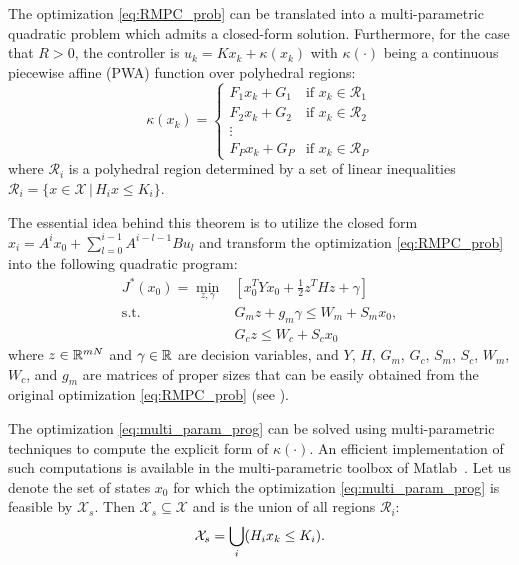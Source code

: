 \begin{theorem}
The optimization \eqref{eq:RMPC_prob} can be translated into a multi-parametric quadratic problem which admits a closed-form solution. Furthermore, for the case that $R>0$, the controller is $u_k = K x_k + \kappa(x_k)$ with $\kappa(\cdot)$ being a continuous piecewise affine (PWA) function over polyhedral regions:
\begin{equation}
\kappa(x_k)=
\begin{cases}
F_1x_k+G_1 & \text{if $x_k\in \mathcal{R}_1$}\\
F_2x_k+G_2 & \text{if $x_k\in \mathcal{R}_2$}\\
\vdots\\
F_Px_k+G_P & \text{if $x_k\in \mathcal{R}_P$}
\end{cases} 
\end{equation}
where $\mathcal{R}_i$ is a polyhedral region determined by a set of linear inequalities $\mathcal R_i = \{x\in\mathcal X\,|\,H_ix\leq K_i\}$. 
\end{theorem}
The essential idea behind this theorem is to utilize the closed form $x_i=A^ix_0+\sum_{l=0}^{i-1}A^{i-l-1}Bu_l$ and transform the optimization \eqref{eq:RMPC_prob} into the following quadratic program:
\begin{align}
\label{eq:multi_param_prog}
J^{\ast}(x_0)=\min_{z,\gamma}& \left[x_0^TYx_0+\frac{1}{2}z^THz+\gamma\right]\\
\text{s.t.} \quad &G_mz+g_m\gamma\leq W_m+S_mx_0,\nonumber\\
&G_cz\leq W_c+S_cx_0\nonumber
\end{align}
where $z\in \mathbb{R}^{mN}$ and $\gamma\in\mathbb{R}$ are decision variables, and $Y$, $H$, $G_m$, $G_c$, $S_m$, $S_c$, $W_m$, $W_c$, and $g_m$ 
are matrices of proper sizes that can be easily obtained from the original optimization \eqref{eq:RMPC_prob}  (see \cite{delaPea:2005}).


The optimization \eqref{eq:multi_param_prog} can be solved using multi-parametric techniques to compute the explicit form of $\kappa(\cdot)$.
An efficient implementation of such computations is available in the multi-parametric toolbox of Matlab~\cite{matlabMPT, matlabYALMIP}.
Let us denote the set of states $x_0$ for which the optimization  \eqref{eq:multi_param_prog} is feasible by $\mathcal X_s$. Then $\mathcal X_s\subseteq \mathcal X$ and is the union of all regions $\mathcal{R}_{i}$:
\begin{equation}
\mathcal X_s = \bigcup_{i}(H_{i}x_{k}\leq K_{i}).
\end{equation}


